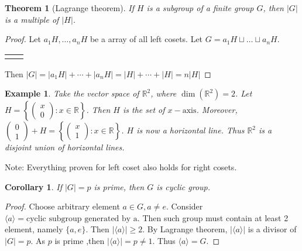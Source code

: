 \documentclass{article}
\theoremstyle{MyNonumberplain}
\theoremstyle{break}
\newtheorem*{proof}{Proof. }
\newcommand{\cyclic}[1]{\langle #1 \rangle}
\newcommand{\nline}{\begin{tabular}{ll}&\\\end{tabular}}
\newcommand{\tmop}{\text}
\theoremstyle{break}
\newtheorem{theorem}{Theorem}[section]
\newtheorem{corollary}{Corollary}[theorem]
\newtheorem{example}{Example}[section]
\theoremstyle{break}
\theoremstyle{definition}
\theoremstyle{break}
\begin{document}
\begin{thmbox}
    \begin{theorem}[Lagrange theorem]
        If $H$ is a subgroup of a finite group $G$, then $|G|$ is a multiple of $|H|$.
    \end{theorem}
    \begin{prfbox}
        \begin{proof}
            Let $a_1 H, \ldots, a_n H$ be a array of all left cosets. Let $G = a_1 H
            \sqcup \ldots \sqcup a_n H$.

            \nline
            
            Then $| G | = | a_1 H | + \cdots + | a_n H | = | H | + \cdots + | H | = n | H
            |$
        \end{proof}
    \end{prfbox}
\end{thmbox}
\begin{expbox}
    \begin{example}
        Take the vector space of $\mathbb{R}^2$, where $\dim (\mathbb{R}^2) = 2$. Let
        $H = \left\{ \left(\begin{array}{c}
          x\\
          0
        \end{array}\right) : x \in \mathbb{R} \right\}$. Then $H$ is the set of $x -
        \tmop{axis}$. Moreover, $\left(\begin{array}{c}
          0\\
          1
        \end{array}\right) + H = \left\{ \left(\begin{array}{c}
          x\\
          1
        \end{array}\right) : x \in \mathbb{R} \right\}$. $H$ is now a horizontal line.
        Thus $\mathbb{R}^2$ is a disjoint union of horizontal lines.
    \end{example}
\end{expbox}

Note: Everything proven for left coset also holds for right cosets.

\begin{thmbox}
    \begin{corollary}
        If $|G|=p$ is prime, then $G$ is cyclic group. 
    \end{corollary}
    \begin{prfbox}
        \begin{proof}
            Choose arbitrary element $a \in G, a \neq e$. Consider $\cyclic{a}= \text{cyclic
            subgroup generated by a.}$ Then such group must contain at least 2 element,
            namely $\{ a, e \}$. Then $| \cyclic{a}| \geq 2$. By Lagrange theorem, $| \cyclic{a}|$
            is a divisor of $| G | = p$. As $p$ is prime ,then $| \cyclic{a}| = p \neq 1$.
            Thus $\cyclic{a}= G$. 
        \end{proof}
    \end{prfbox}
\end{thmbox}
\end{document}
